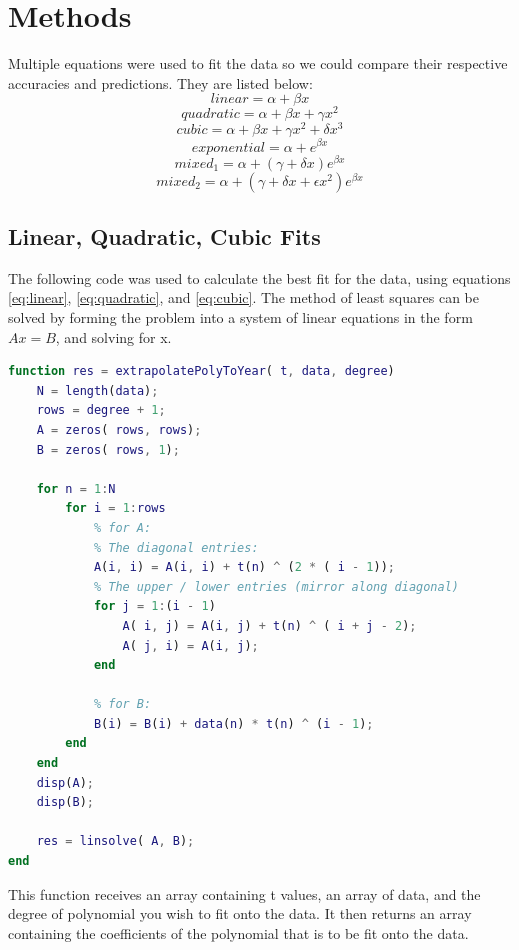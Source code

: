 \documentclass[11pt]{article}
\begin{document}
\section{Methods}
Multiple equations were used to fit the data so we could compare their respective accuracies and predictions. They are listed below:
\begin{equation}\label{eq:linear}
linear = \alpha + \beta x
\end{equation}
\begin{equation}\label{eq:quadratic}
quadratic = \alpha + \beta x + \gamma x^2
\end{equation}
\begin{equation}\label{eq:cubic}
cubic = \alpha + \beta x + \gamma x^2 + \delta x^3
\end{equation}
\begin{equation}\label{eq:exp}
exponential = \alpha + e^{\beta x}
\end{equation}
\begin{equation}\label{eq:mix1}
mixed_1 = \alpha + (\gamma + \delta x)e^{\beta x}
\end{equation}
\begin{equation}\label{eq:mix2}
mixed_2 = \alpha + (\gamma + \delta x + \epsilon x^2)e^{\beta x}
\end{equation}

\subsection{ Linear, Quadratic, Cubic Fits}
The following code was used to calculate the best fit for the data, using equations \eqref{eq:linear}, \eqref{eq:quadratic}, and \eqref{eq:cubic}. The method of least squares can be solved by forming the problem into a system of linear equations in the form $Ax = B$, and solving for x.

\begin{lstlisting}[language=Matlab, style=myStyle]
function res = extrapolatePolyToYear( t, data, degree)
    N = length(data);
    rows = degree + 1;
    A = zeros( rows, rows);
    B = zeros( rows, 1);
    
    for n = 1:N
        for i = 1:rows
            % for A:
            % The diagonal entries:
            A(i, i) = A(i, i) + t(n) ^ (2 * ( i - 1));
            % The upper / lower entries (mirror along diagonal)
            for j = 1:(i - 1)
                A( i, j) = A(i, j) + t(n) ^ ( i + j - 2);
                A( j, i) = A(i, j);
            end
            
            % for B:
            B(i) = B(i) + data(n) * t(n) ^ (i - 1);
        end
    end
    disp(A);
    disp(B);

    res = linsolve( A, B);
end
\end{lstlisting}
This function receives an array containing t values, an array of data, and the degree of polynomial you wish to fit onto the data. It then returns an array containing the coefficients of the polynomial that is to be fit onto the data.\\
\end{document}

